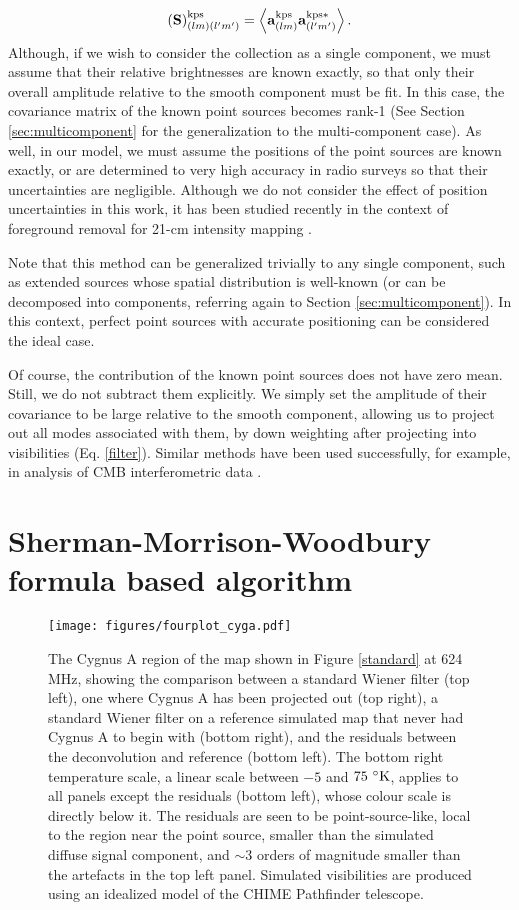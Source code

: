 \begin{equation}
\mathbf{(S)}^{\rm kps}_{(lm)(l'm')} = \left\langle \mathbf{a}^{\rm kps}_{(lm)}\mathbf{a}^{{\rm kps}*}_{(l'm')}\right\rangle.
\label{kpscov}
\end{equation}
Although, if we wish to consider the collection as a single component, we must assume that their relative brightnesses are known exactly, so that only their overall amplitude relative to the smooth component must be fit. In this case, the covariance matrix of the known point sources becomes rank-1 (See Section \ref{sec:multicomponent} for the generalization to the multi-component case). As well, in our model, we must assume the positions of the point sources are known exactly, or are determined to very high accuracy in radio surveys so that their uncertainties are negligible. Although we do not consider the effect of position uncertainties in this work, it has been studied recently in the context of foreground removal for 21-cm intensity mapping \citep{barry2016, ewall-wice2016}. 

Note that this method can be generalized trivially to any single component, such as extended sources whose spatial distribution is well-known (or can be decomposed into components, referring again to Section \ref{sec:multicomponent}). In this context, perfect point sources with accurate positioning can be considered the ideal case. 

Of course, the contribution of the known point sources does not have zero mean. Still, we do not subtract them explicitly. We simply set the amplitude of their covariance to be large relative to the smooth component, allowing us to project out all modes associated with them, by down weighting after projecting into visibilities (Eq. \eqref{filter}). Similar methods have been used successfully, for example, in analysis of CMB interferometric data \citep{myerscbi}.

\section{Sherman-Morrison-Woodbury formula based algorithm}
\label{sec:algorithm}

\begin{figure*}
\centering
\texttt{[image: figures/fourplot\_cyga.pdf]}
\caption{The Cygnus A region of the map shown in Figure \ref{standard} at 624 MHz, showing the comparison between a standard Wiener filter (top left), one where Cygnus A has been projected out (top right), a standard Wiener filter on a reference simulated map that never had Cygnus A to begin with (bottom right), and the residuals between the deconvolution and reference (bottom left). The bottom right temperature scale, a linear scale between $-5$ and $75~{\rm ^{\circ}K}$, applies to all panels except the residuals (bottom left), whose colour scale is directly below it. The residuals are seen to be point-source-like, local to the region near the point source, smaller than the simulated diffuse signal component, and $\sim 3$ orders of magnitude smaller than the artefacts in the top left panel. Simulated visibilities are produced using an idealized model of the CHIME Pathfinder telescope.}
\label{cygzoom}
\end{figure*}

